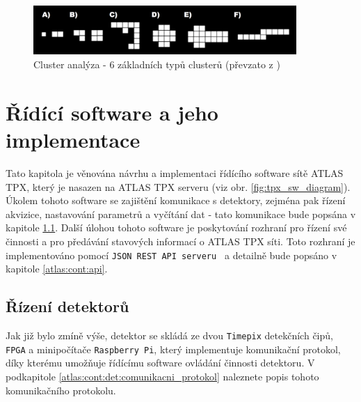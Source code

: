 \begin{figure}[t]
	\begin{center}
		\includegraphics[width=10cm]{figures/ca.png}
		\caption{Cluster analýza - 6 základních typů clusterů (převzato z \cite{TurecekThesis2011})}
		\label{fig:tpx_ca}
	\end{center}
\end{figure}


\section{Řídící software a jeho implementace}\label{atlas:cont}
Tato kapitola je věnována návrhu a implementaci řídícího software sítě ATLAS TPX, který je nasazen na ATLAS TPX serveru (viz obr. \ref{fig:tpx_sw_diagram}). Úkolem  tohoto software se zajištění komunikace s detektory, zejména pak řízení akvizice, nastavování parametrů a vyčítání dat - tato komunikace bude popsána v kapitole \ref{atlas:cont:det}. Další úlohou tohoto software je poskytování rozhraní pro řízení své činnosti a pro předávání stavových informací o ATLAS TPX síti. Toto rozhraní je implementováno pomocí \texttt{JSON REST API serveru } a detailně bude popsáno v kapitole \ref{atlas:cont:api}.

\subsection{Řízení detektorů}\label{atlas:cont:det} %
Jak již bylo zmíně výše, detektor se skládá ze dvou \texttt{Timepix} detekčních čipů, \texttt{FPGA} a minipočítače \texttt{Raspberry Pi}, který implementuje komunikační protokol, díky kterému umožňuje řídícímu software ovládání činnosti detektoru. V podkapitole \ref{atlas:cont:det:comunikacni_protokol} naleznete popis tohoto komunikačního protokolu.

